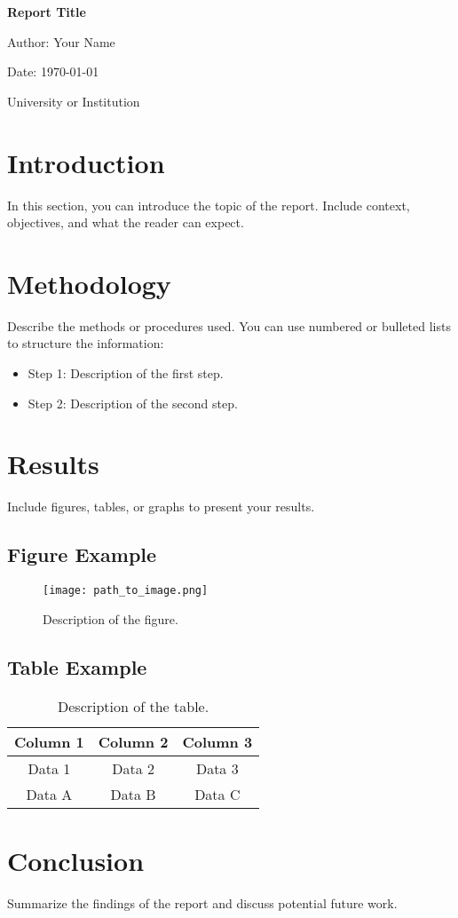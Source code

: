\documentclass[a4paper,12pt]{report} %
\begin{document}
\begin{titlepage}
    \centering
    {\Huge\bfseries Report Title \par}
    \vspace{2cm}
    {\Large Author: Your Name \par}
    \vspace{1.5cm}
    {\large Date: \today \par}
    \vfill
    {\large University or Institution \par}
\end{titlepage}

\tableofcontents
\newpage

\chapter{Introduction}
In this section, you can introduce the topic of the report. Include context, objectives, and what the reader can expect.

\chapter{Methodology}
Describe the methods or procedures used. You can use numbered or bulleted lists to structure the information:
\begin{itemize}
    \item Step 1: Description of the first step.
    \item Step 2: Description of the second step.
\end{itemize}

\chapter{Results}
Include figures, tables, or graphs to present your results.

\section{Figure Example}
\begin{figure}[h!]
    \centering
    \texttt{[image: path\_to\_image.png]} %
    \caption{Description of the figure.}
    \label{fig:example}
\end{figure}

\section{Table Example}
\begin{table}[h!]
    \centering
    \begin{tabular}{|c|c|c|}
        \hline
        Column 1 & Column 2 & Column 3 \\
        \hline
        Data 1 & Data 2 & Data 3 \\
        \hline
        Data A & Data B & Data C \\
        \hline
    \end{tabular}
    \caption{Description of the table.}
    \label{tab:example}
\end{table}

\chapter{Conclusion}
Summarize the findings of the report and discuss potential future work.
\end{document}
